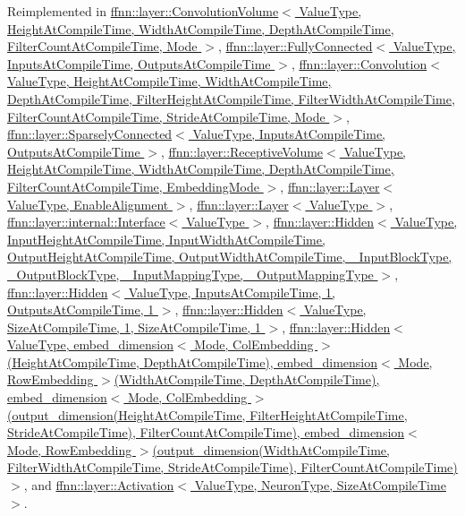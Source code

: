 Reimplemented in \hyperlink{classffnn_1_1layer_1_1_convolution_volume_a77f5965e61f450d0fe72fa091a3e667a}{ffnn\-::layer\-::\-Convolution\-Volume$<$ Value\-Type, Height\-At\-Compile\-Time, Width\-At\-Compile\-Time, Depth\-At\-Compile\-Time, Filter\-Count\-At\-Compile\-Time, Mode $>$}, \hyperlink{classffnn_1_1layer_1_1_fully_connected_a4d449a95d01e3ad04a7813d70d296e0c}{ffnn\-::layer\-::\-Fully\-Connected$<$ Value\-Type, Inputs\-At\-Compile\-Time, Outputs\-At\-Compile\-Time $>$}, \hyperlink{classffnn_1_1layer_1_1_convolution_a46927244521dcc241ba0e0bcd103f841}{ffnn\-::layer\-::\-Convolution$<$ Value\-Type, Height\-At\-Compile\-Time, Width\-At\-Compile\-Time, Depth\-At\-Compile\-Time, Filter\-Height\-At\-Compile\-Time, Filter\-Width\-At\-Compile\-Time, Filter\-Count\-At\-Compile\-Time, Stride\-At\-Compile\-Time, Mode $>$}, \hyperlink{classffnn_1_1layer_1_1_sparsely_connected_a0996cd78dc2f76cab36fac2ec5c8f323}{ffnn\-::layer\-::\-Sparsely\-Connected$<$ Value\-Type, Inputs\-At\-Compile\-Time, Outputs\-At\-Compile\-Time $>$}, \hyperlink{classffnn_1_1layer_1_1_receptive_volume_aebfd8f149057b061d6880669376175e3}{ffnn\-::layer\-::\-Receptive\-Volume$<$ Value\-Type, Height\-At\-Compile\-Time, Width\-At\-Compile\-Time, Depth\-At\-Compile\-Time, Filter\-Count\-At\-Compile\-Time, Embedding\-Mode $>$}, \hyperlink{classffnn_1_1layer_1_1_layer_a66c56645e54f6e864fb716fdc8858828}{ffnn\-::layer\-::\-Layer$<$ Value\-Type, Enable\-Alignment $>$}, \hyperlink{classffnn_1_1layer_1_1_layer_a66c56645e54f6e864fb716fdc8858828}{ffnn\-::layer\-::\-Layer$<$ Value\-Type $>$}, \hyperlink{classffnn_1_1layer_1_1internal_1_1_interface_a88b5bd86aafd361d3a84dc6cba211195}{ffnn\-::layer\-::internal\-::\-Interface$<$ Value\-Type $>$}, \hyperlink{classffnn_1_1layer_1_1_hidden_a696f61b2d9b661b7a8d6bdb3dc32b536}{ffnn\-::layer\-::\-Hidden$<$ Value\-Type, Input\-Height\-At\-Compile\-Time, Input\-Width\-At\-Compile\-Time, Output\-Height\-At\-Compile\-Time, Output\-Width\-At\-Compile\-Time, \-\_\-\-Input\-Block\-Type, \-\_\-\-Output\-Block\-Type, \-\_\-\-Input\-Mapping\-Type, \-\_\-\-Output\-Mapping\-Type $>$}, \hyperlink{classffnn_1_1layer_1_1_hidden_a696f61b2d9b661b7a8d6bdb3dc32b536}{ffnn\-::layer\-::\-Hidden$<$ Value\-Type, Inputs\-At\-Compile\-Time, 1, Outputs\-At\-Compile\-Time, 1 $>$}, \hyperlink{classffnn_1_1layer_1_1_hidden_a696f61b2d9b661b7a8d6bdb3dc32b536}{ffnn\-::layer\-::\-Hidden$<$ Value\-Type, Size\-At\-Compile\-Time, 1, Size\-At\-Compile\-Time, 1 $>$}, \hyperlink{classffnn_1_1layer_1_1_hidden_a696f61b2d9b661b7a8d6bdb3dc32b536}{ffnn\-::layer\-::\-Hidden$<$ Value\-Type, embed\-\_\-dimension$<$ Mode, Col\-Embedding $>$(\-Height\-At\-Compile\-Time, Depth\-At\-Compile\-Time), embed\-\_\-dimension$<$ Mode, Row\-Embedding $>$(\-Width\-At\-Compile\-Time, Depth\-At\-Compile\-Time), embed\-\_\-dimension$<$ Mode, Col\-Embedding $>$(output\-\_\-dimension(\-Height\-At\-Compile\-Time, Filter\-Height\-At\-Compile\-Time, Stride\-At\-Compile\-Time), Filter\-Count\-At\-Compile\-Time), embed\-\_\-dimension$<$ Mode, Row\-Embedding $>$(output\-\_\-dimension(\-Width\-At\-Compile\-Time, Filter\-Width\-At\-Compile\-Time, Stride\-At\-Compile\-Time), Filter\-Count\-At\-Compile\-Time)$>$}, and \hyperlink{classffnn_1_1layer_1_1_activation_a045ecc330b67cdc3a41d6d7fc3a8dbf2}{ffnn\-::layer\-::\-Activation$<$ Value\-Type, Neuron\-Type, Size\-At\-Compile\-Time $>$}.
